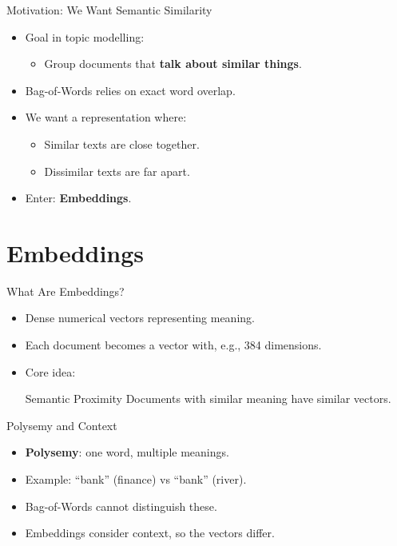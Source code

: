 \documentclass[compress]{beamer}
\begin{document}
\begin{frame}{Motivation: We Want Semantic Similarity}
    \begin{itemize}
        \item Goal in topic modelling:
        \begin{itemize}
            \item Group documents that \textbf{talk about similar things}.
        \end{itemize}
        \item Bag-of-Words relies on exact word overlap.
        \item We want a representation where:
        \begin{itemize}
            \item Similar texts are close together.
            \item Dissimilar texts are far apart.
        \end{itemize}
        \item Enter: \textbf{Embeddings}.
    \end{itemize}
\end{frame}

\section{Embeddings}

\begin{frame}{What Are Embeddings?}
    \begin{itemize}
        \item Dense numerical vectors representing meaning.
        \item Each document becomes a vector with, e.g., 384 dimensions.
        \item Core idea:
        \begin{block}{Semantic Proximity}
            Documents with similar meaning have similar vectors.
        \end{block}
    \end{itemize}
\end{frame}


\begin{frame}{Polysemy and Context}
    \begin{itemize}
        \item \textbf{Polysemy}: one word, multiple meanings.
        \item Example: ``bank'' (finance) vs ``bank'' (river).
        \item Bag-of-Words cannot distinguish these.
        \item Embeddings consider context, so the vectors differ.
    \end{itemize}
\end{frame}
\end{document}
